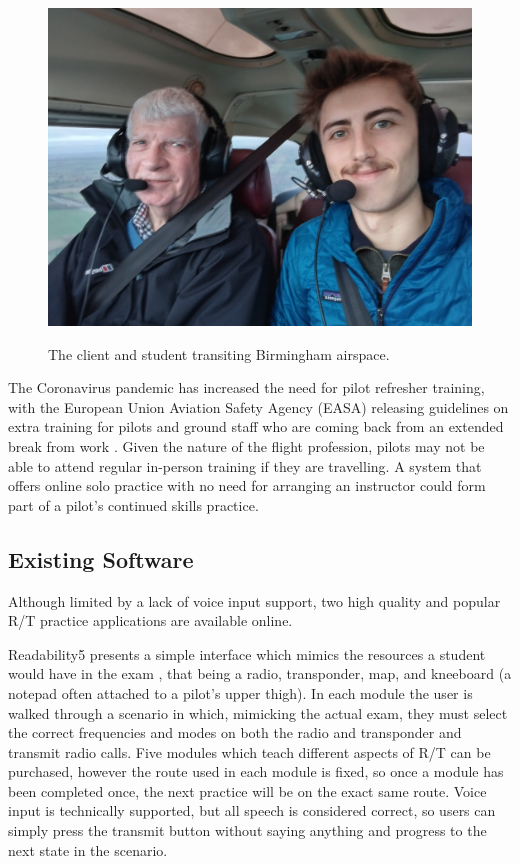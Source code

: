 \begin{figure}[H]
    \centering
	\includegraphics[scale = 0.08]{../document-resources/images/Aerial-selfie}
    \label{aerial-selfie}
    \caption{The client and student transiting Birmingham airspace.}
\end{figure}

The Coronavirus pandemic has increased the need for pilot refresher training, with the European Union Aviation Safety Agency (EASA) releasing guidelines on extra training for pilots and ground staff who are coming back from an extended break from work \cite{EASA-Training-Post-Covid}. Given the nature of the flight profession, pilots may not be able to attend regular in-person training if they are travelling. A system that offers online solo practice with no need for arranging an instructor could form part of a pilot’s continued skills practice.

\subsection{Existing Software}
Although limited by a lack of voice input support, two high quality and popular R/T practice applications are available online. 

Readability5 presents a simple interface which mimics the resources a student would have in the exam \cite{Readability5}, that being a radio, transponder, map, and kneeboard (a notepad often attached to a pilot's upper thigh). In each module the user is walked through a scenario in which, mimicking the actual exam, they must select the correct frequencies and modes on both the radio and transponder and transmit radio calls. Five modules which teach different aspects of R/T can be purchased, however the route used in each module is fixed, so once a module has been completed once, the next practice will be on the exact same route. Voice input is technically supported, but all speech is considered correct, so users can simply press the transmit button without saying anything and progress to the next state in the scenario.

